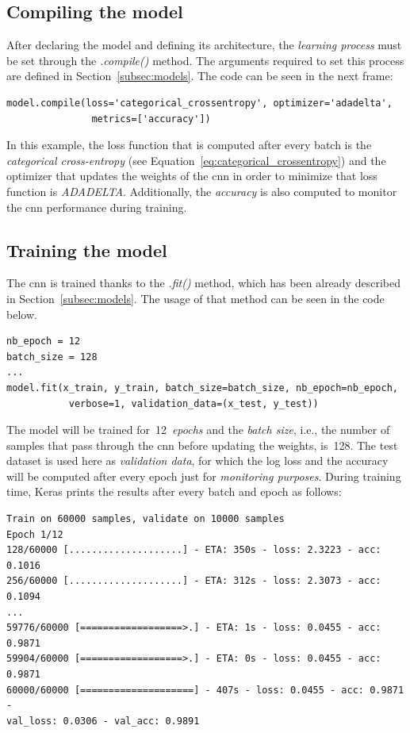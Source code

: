 \subsection{Compiling the model}
After declaring the model and defining its architecture, the \emph{learning process} must be set through the  \textit{.compile()} method. The arguments required to set this process are defined in Section~\ref{subsec:models}. The code can be seen in the next frame:
\begin{lstlisting}
model.compile(loss='categorical_crossentropy', optimizer='adadelta', 
               metrics=['accuracy'])
\end{lstlisting}

In this example, the loss function that is computed after every batch is the \emph{categorical cross-entropy} (see Equation~\ref{eq:categorical_crossentropy}) and the optimizer that updates the weights of the \gls{cnn} in order to minimize that loss function is \emph{ADADELTA}. Additionally, the \emph{accuracy} is also computed to monitor the \gls{cnn} performance during training.

\subsection{Training the model}
The \gls{cnn} is trained thanks to the \textit{.fit()} method, which has been already described in Section~\ref{subsec:models}. The usage of that method can be seen in the code below.
\begin{lstlisting}
nb_epoch = 12
batch_size = 128
...
model.fit(x_train, y_train, batch_size=batch_size, nb_epoch=nb_epoch,
           verbose=1, validation_data=(x_test, y_test))
\end{lstlisting}

The model will be trained for~12~\emph{epochs} and the \emph{batch size}, i.e., the number of samples that pass through the \gls{cnn} before updating the weights, is~128. The test dataset is used here as \emph{validation data}, for which the log loss and the accuracy will be computed after every epoch just for \emph{monitoring purposes}. During training time, Keras prints the results after every batch and epoch as follows:
\begin{Verbatim}[frame=single]
Train on 60000 samples, validate on 10000 samples
Epoch 1/12
128/60000 [....................] - ETA: 350s - loss: 2.3223 - acc: 0.1016
256/60000 [....................] - ETA: 312s - loss: 2.3073 - acc: 0.1094
...
59776/60000 [==================>.] - ETA: 1s - loss: 0.0455 - acc: 0.9871
59904/60000 [==================>.] - ETA: 0s - loss: 0.0455 - acc: 0.9871
60000/60000 [====================] - 407s - loss: 0.0455 - acc: 0.9871 - 
val_loss: 0.0306 - val_acc: 0.9891
\end{Verbatim}

